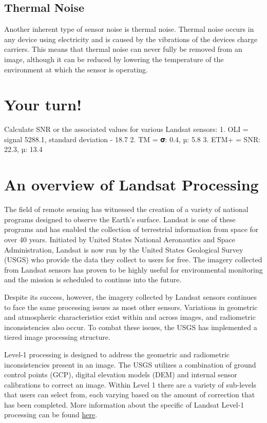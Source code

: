\documentclass[
]{book}
\begin{document}
\hypertarget{thermal-noise}{%
\subsection{Thermal Noise}\label{thermal-noise}}

Another inherent type of sensor noise is thermal noise. Thermal noise occurs in any device using electricity and is caused by the vibrations of the devices charge carriers. This means that thermal noise can never fully be removed from an image, although it can be reduced by lowering the temperature of the environment at which the sensor is operating.

\hypertarget{your-turn-7}{%
\section*{Your turn!}\label{your-turn-7}}

Calculate SNR or the associated values for various Landsat sensors:
1. OLI = signal 5288.1, standard deviation - 18.7
2. TM = 𝛔: 0.4, µ: 5.8
3. ETM+ = SNR: 22.3, µ: 13.4

\hypertarget{an-overview-of-landsat-processing}{%
\section{An overview of Landsat Processing}\label{an-overview-of-landsat-processing}}

The field of remote sensing has witnessed the creation of a variety of national programs designed to observe the Earth's surface. Landsat is one of these programs and has enabled the collection of terrestrial information from space for over 40 years. Initiated by United States National Aeronautics and Space Administration, Landsat is now run by the United States Geological Survey (USGS) who provide the data they collect to users for free. The imagery collected from Landsat sensors has proven to be highly useful for environmental monitoring and the mission is scheduled to continue into the future.

Despite its success, however, the imagery collected by Landsat sensors continues to face the same processing issues as most other sensors. Variations in geometric and atmospheric characteristics exist within and across images, and radiometric inconsistencies also occur. To combat these issues, the USGS has implemented a tiered image processing structure.

Level-1 processing is designed to address the geometric and radiometric inconsistencies present in an image. The USGS utilizes a combination of ground control points (GCP), digital elevation models (DEM) and internal sensor calibrations to correct an image. Within Level 1 there are a variety of sub-levels that users can select from, each varying based on the amount of correction that has been completed. More information about the specific of Landsat Level-1 processing can be found \href{https://www.usgs.gov/core-science-systems/nli/landsat/landsat-level-1-processing-details}{here}.
\end{document}
